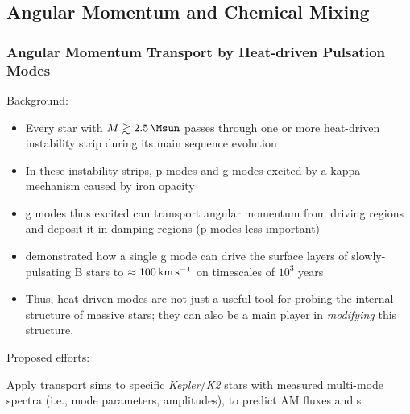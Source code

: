 
\subsection{Angular Momentum and Chemical Mixing}


{\color{brown}
\subsubsection{Angular Momentum Transport by Heat-driven Pulsation Modes}

Background:
\begin{itemize}
\item Every star with $M \gtrsim 2.5\,\Msun$ passes through one or more heat-driven instability strip during its main sequence evolution
\item In these instability strips, p modes and g modes excited by a kappa mechanism caused by iron opacity
\item g modes thus excited can transport angular momentum from driving regions and deposit it in damping regions (p modes less important)
\item \citet{Townsend:2017} demonstrated how a single g mode can drive the surface layers of slowly-pulsating B stars to $\approx 100\,{\rm km\,s^{-1}}$ on timescales of $10^{3}$ years
\item Thus, heat-driven modes are not just a useful tool for probing the internal structure of massive stars; they can also be a main player in \emph{modifying} this structure.
\end{itemize}

Proposed efforts:
\item Apply transport sims to specific \emph{Kepler}/\emph{K2} stars with measured multi-mode spectra (i.e., mode parameters, amplitudes), to predict AM fluxes and s


}



